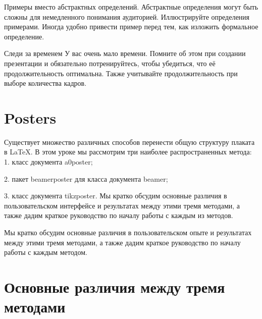 \documentclass{article}
\begin{document}
      \begin{frame}{Примеры вместо абстрактных определений.}
  Абстрактные определения могут быть сложны для немедленного понимания аудиторией.
  Иллюстрируйте определения примерами. Иногда удобно привести пример перед тем, как изложить формальное определение.
  \end{frame}


        \begin{frame}{Следи за временем}
          У вас очень мало времени. Помните об этом при создании презентации и
обязательно потренируйтесь, чтобы убедиться, что её продолжительность оптимальна. Также учитывайте продолжительность
при выборе количества кадров.
  \end{frame}


  \section{Posters}
  \label{sec:posters}

  Существует множество различных способов перенести общую структуру плаката в LaTeX.
В этом уроке мы рассмотрим три наиболее распространенных метода:
1. класс документа a0poster;

2. пакет beamerposter для класса документа beamer;

3. класс документа tikzposter.
Мы кратко обсудим основные различия в пользовательском интерфейсе и результатах между
этими тремя методами, а также дадим краткое руководство по началу работы с каждым из
методов.

Мы кратко обсудим основные различия в пользовательском опыте и результатах между
этими тремя методами, а также дадим краткое руководство по началу работы с каждым
методом.


  \section{Основные различия между тремя методами}
  \label{sec:diffs}
\end{document}
